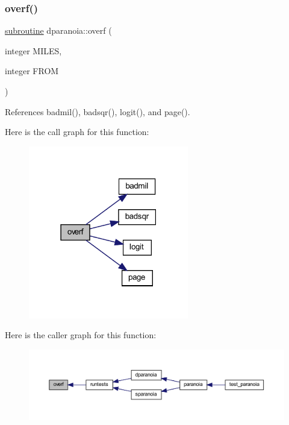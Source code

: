 \subsubsection{\texorpdfstring{overf()}{overf()}}
{\footnotesize\ttfamily \hyperlink{M__stopwatch_83_8txt_acfbcff50169d691ff02d4a123ed70482}{subroutine} dparanoia\+::overf (\begin{DoxyParamCaption}\item[{integer}]{M\+I\+L\+ES,  }\item[{integer}]{F\+R\+OM }\end{DoxyParamCaption})}



References badmil(), badsqr(), logit(), and page().

Here is the call graph for this function\+:
\nopagebreak
\begin{figure}[H]
\begin{center}
\leavevmode
\includegraphics[width=198pt]{dparanoia_8f90_afbcfc57adfa91735066899a4f2bc8637_cgraph}
\end{center}
\end{figure}
Here is the caller graph for this function\+:
\nopagebreak
\begin{figure}[H]
\begin{center}
\leavevmode
\includegraphics[width=350pt]{dparanoia_8f90_afbcfc57adfa91735066899a4f2bc8637_icgraph}
\end{center}
\end{figure}
\mbox{\label{dparanoia_8f90_a6586ce42b5da5bd64211632cefda8a76}} 
